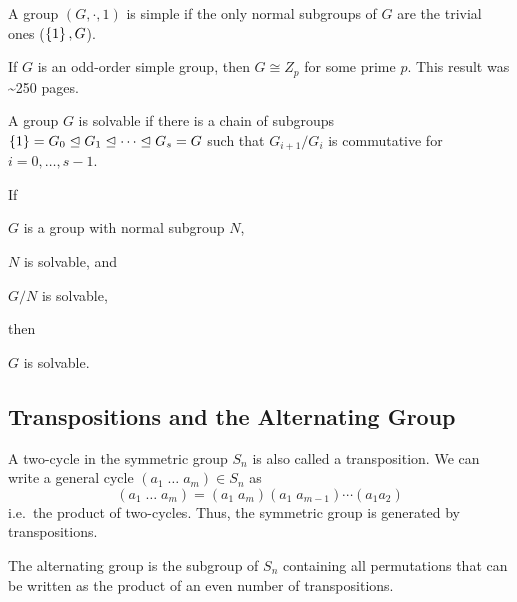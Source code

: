 \documentclass[a5paper]{article}
\begin{document}
\begin{definition}
	A group $(G,\cdot,1)$ is simple if the only normal subgroups of $G$ are the
  trivial ones ($\left\{1\right\},G$).
\end{definition}

\begin{theorem}
  If $G$ is an odd-order simple group, then $G\cong Z_p$ for some prime $p$.
  This result was \sim 250 pages.
\end{theorem}

\begin{definition}
	A group $G$ is solvable if there is a chain of subgroups
  $\left\{1\right\}=G_0\trianglelefteq G_1\trianglelefteq\cdots\trianglelefteq G_s=G$
  such that $G_{i+1}/G_i$ is commutative for $i=0,\ldots,s-1$.
\end{definition}

\begin{theorem}
	If
  \begin{premises}
    \item $G$ is a group with normal subgroup $N$,
    \item $N$ is solvable, and
    \item $G/N$ is solvable,
  \end{premises}
  then
  \begin{conclusion}
    $G$ is solvable.
  \end{conclusion}
\end{theorem}

\subsection{Transpositions and the Alternating Group}
\begin{definition}
	A two-cycle in the symmetric group $S_n$ is also called a transposition.
  We can write a general cycle $(a_1\;\ldots\;a_m)\in S_n$ as
  \begin{equation*}
    (a_1\;\ldots\;a_m)=(a_1\;a_m)(a_1\;a_{m-1})\cdots(a_1a_2)
  \end{equation*}
  i.e.\ the product of two-cycles. Thus, the symmetric group is generated by
  transpositions. 
\end{definition}

\begin{definition}
	The alternating group is the subgroup of $S_n$ containing all permutations
  that can be written as the product of an even number of transpositions.
\end{definition}
\end{document}
